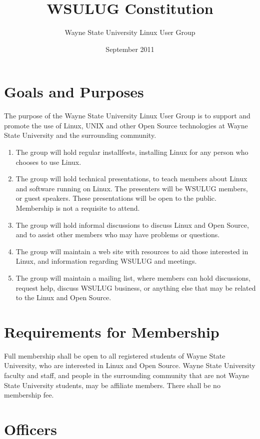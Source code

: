 \documentclass{article}
\begin{document}
\title{WSULUG Constitution}
\author{Wayne State University Linux User Group}
\date{September 2011}
\maketitle

\section{Goals and Purposes}
The purpose of the Wayne State University Linux User Group is to support
and promote the use of Linux, UNIX and other Open Source technologies at
Wayne State University and the surrounding community.

\begin{enumerate}
\item The group will hold regular installfests, installing Linux for any
      person who chooses to use Linux.
\item The group will hold technical presentations, to teach members about
      Linux and software running on Linux.  The presenters will be WSULUG
      members, or guest speakers.  These presentations will be open to the
      public. Membership is not a requisite to attend.
\item The group will hold informal discussions to discuss Linux and Open
      Source, and to assist other members who may have problems or questions.
\item The group will maintain a web site with resources to aid those
      interested in Linux, and information regarding WSULUG and meetings.
\item The group will maintain a mailing list, where members can hold
      discussions, request help, discuss WSULUG business, or anything else
      that may be related to the Linux and Open Source.
\end{enumerate}

\section{Requirements for Membership}
Full membership shall be open to all registered students of Wayne State
University, who are interested in Linux and Open Source.  Wayne State
University faculty and staff, and people in the surrounding community
that are not Wayne State University students, may be affiliate members.
There shall be no membership fee.

\section{Officers}
\end{document}
